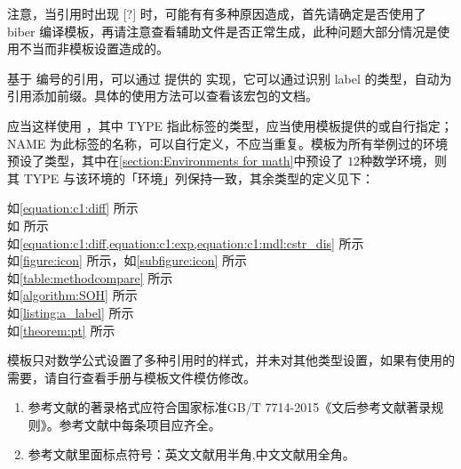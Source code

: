 

注意，当引用时出现 [?] 时，可能有有多种原因造成，首先请确定是否使用了 biber 编译模板，再请注意查看辅助文件是否正常生成，此种问题大部分情况是使用不当而非模板设置造成的。






基于 \clist{\label{}} 编号的引用，可以通过  提供的 \clist{\cref} 实现，它可以通过识别 label 的类型，自动为引用添加前缀。具体的使用方法可以查看该宏包的文档。

应当这样使用 \clist{\label{TYPE:NAME}}，其中 TYPE 指此标签的类型，应当使用模板提供的或自行指定；NAME 为此标签的名称，可以自行定义，不应当重复。模板为所有举例过的环境预设了类型，其中在\cref{section:Environments for math}中预设了 $12$种数学环境，则其 TYPE 与该环境的「环境」列保持一致，其余类型的定义见下：

\begin{texcode}[]{}
  如\cref{equation:c1:diff} 所示 \\
  如 所示 \\
  如\cref{equation:c1:diff,equation:c1:exp,equation:c1:mdl:cstr_dis} 所示 \\
  如\cref{figure:icon} 所示，如\cref{subfigure:icon} 所示 \\
  如\cref{table:methodcompare} 所示 \\
  如\cref{algorithm:SOH} 所示 \\
  如\cref{listing:a_label} 所示 \\
  如\cref{theorem:pt} 所示
\end{texcode}

模板只对数学公式设置了多种引用时的样式，并未对其他类型设置，如果有使用的需要，请自行查看手册与模板文件模仿修改。


\begin{tcolorbox}[colback=red!5!white,colframe=red!75!black]
  \begin{enumerate}[leftmargin=0.5cm]
    \item 参考文献的著录格式应符合国家标准GB/T 7714-2015《文后参考文献著录规则》。参考文献中每条项目应齐全。
    \item 参考文献里面标点符号：英文文献用半角,中文文献用全角。
  \end{enumerate}
\end{tcolorbox}

